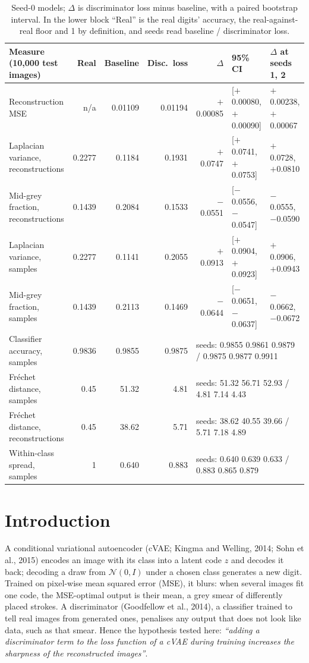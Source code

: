 \documentclass[10pt,a4paper,twocolumn]{article}
\begin{document}
\begin{table}[t]
\centering
\footnotesize
\begin{tabular}{@{}lrrrrll@{}}
\toprule
Measure (10,000 test images) & Real & Baseline & Disc.\ loss & $\Delta$ & 95\% CI & $\Delta$ at seeds 1, 2 \\
\midrule
Reconstruction MSE & n/a & 0.01109 & 0.01194 & $+$0.00085 & [$+$0.00080, $+$0.00090] & $+$0.00238, $+$0.00067 \\
Laplacian variance, reconstructions & 0.2277 & 0.1184 & 0.1931 & $+$0.0747 & [$+$0.0741, $+$0.0753] & $+$0.0728, $+$0.0810 \\
Mid-grey fraction, reconstructions & 0.1439 & 0.2084 & 0.1533 & $-$0.0551 & [$-$0.0556, $-$0.0547] & $-$0.0555, $-$0.0590 \\
Laplacian variance, samples & 0.2277 & 0.1141 & 0.2055 & $+$0.0913 & [$+$0.0904, $+$0.0923] & $+$0.0906, $+$0.0943 \\
Mid-grey fraction, samples & 0.1439 & 0.2113 & 0.1469 & $-$0.0644 & [$-$0.0651, $-$0.0637] & $-$0.0662, $-$0.0672 \\
\midrule
Classifier accuracy, samples & 0.9836 & 0.9855 & 0.9875 & \multicolumn{3}{l}{seeds: 0.9855 0.9861 0.9879 / 0.9875 0.9877 0.9911} \\
Fréchet distance, samples & 0.45 & 51.32 & 4.81 & \multicolumn{3}{l}{seeds: 51.32 56.71 52.93 / 4.81 7.14 4.43} \\
Fréchet distance, reconstructions & 0.45 & 38.62 & 5.71 & \multicolumn{3}{l}{seeds: 38.62 40.55 39.66 / 5.71 7.18 4.89} \\
Within-class spread, samples & 1 & 0.640 & 0.883 & \multicolumn{3}{l}{seeds: 0.640 0.639 0.633 / 0.883 0.865 0.879} \\
\bottomrule
\end{tabular}
\caption{Seed-0 models; $\Delta$ is discriminator loss minus baseline, with a paired bootstrap
interval. In the lower block ``Real'' is the real digits' accuracy, the real-against-real floor
and 1 by definition, and seeds read baseline / discriminator loss.}
\end{table}

\section{Introduction}
A conditional variational autoencoder (cVAE; Kingma and Welling, 2014; Sohn et al., 2015) encodes
an image with its class into a latent code $z$ and decodes it back; decoding a draw from
$\mathcal{N}(0, I)$ under a chosen class generates a new digit. Trained on pixel-wise mean
squared error (MSE), it blurs: when several images fit one code, the MSE-optimal output is their
mean, a grey smear of differently placed strokes. A discriminator (Goodfellow et al., 2014), a
classifier trained to tell real images from generated ones, penalises any output that does not
look like data, such as that smear. Hence the hypothesis tested here: \emph{``adding a
discriminator term to the loss function of a cVAE during training increases the sharpness of the
reconstructed images''}.
\end{document}
